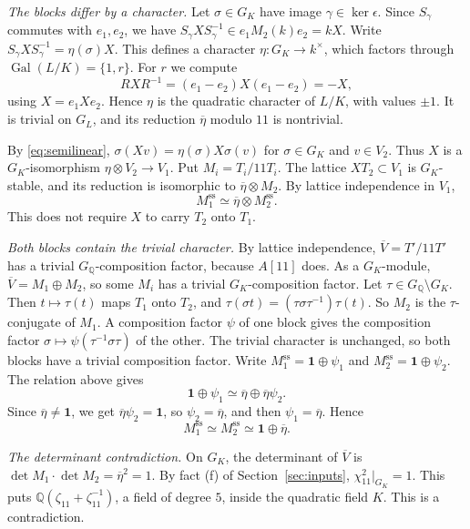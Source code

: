 \documentclass[11pt]{article}
\theoremstyle{remark}
\newcommand{\Q}{\mathbb Q}
\DeclareMathOperator{\Gal}{Gal}
\begin{document}
\emph{The blocks differ by a character.} Let \(\sigma\in G_K\) have
image \(\gamma\in\ker\epsilon\). Since \(S_\gamma\) commutes with
\(e_1,e_2\), we have \(S_\gamma XS_\gamma^{-1}\in e_1M_2(k)e_2=kX\).
Write \(S_\gamma XS_\gamma^{-1}=\eta(\sigma)X\). This defines a
character \(\eta:G_K\to k^\times\), which factors through
\(\Gal(L/K)=\{1,r\}\). For \(r\) we compute
\[
 RXR^{-1}=(e_1-e_2)X(e_1-e_2)=-X,
\]
using \(X=e_1Xe_2\). Hence \(\eta\) is the quadratic character of
\(L/K\), with values \(\pm1\). It is trivial on \(G_L\), and its
reduction \(\overline\eta\) modulo \(11\) is nontrivial.

By \eqref{eq:semilinear}, \(\sigma(Xv)=\eta(\sigma)X\sigma(v)\) for
\(\sigma\in G_K\) and \(v\in V_2\). Thus \(X\) is a
\(G_K\)-isomorphism \(\eta\otimes V_2\to V_1\). Put
\(M_i=T_i/11T_i\). The lattice \(XT_2\subset V_1\) is
\(G_K\)-stable, and its reduction is isomorphic to
\(\overline\eta\otimes M_2\). By lattice independence in \(V_1\),
\[
 M_1^{\mathrm{ss}}\simeq\overline\eta\otimes M_2^{\mathrm{ss}}.
\]
This does not require \(X\) to carry \(T_2\) onto \(T_1\).

\emph{Both blocks contain the trivial character.} By lattice
independence, \(\overline V=T'/11T'\) has a trivial
\(G_{\Q}\)-composition factor, because \(A[11]\) does. As a
\(G_K\)-module, \(\overline V=M_1\oplus M_2\), so some \(M_i\) has a
trivial \(G_K\)-composition factor. Let
\(\tau\in G_{\Q}\setminus G_K\). Then \(t\mapsto\tau(t)\) maps
\(T_1\) onto \(T_2\), and \(\tau(\sigma t)=(\tau\sigma\tau^{-1})\tau(t)\).
So \(M_2\) is the \(\tau\)-conjugate of \(M_1\). A composition factor
\(\psi\) of one block gives the composition factor
\(\sigma\mapsto\psi(\tau^{-1}\sigma\tau)\) of the other. The trivial
character is unchanged, so both blocks have a trivial composition
factor. Write \(M_1^{\mathrm{ss}}=\mathbf1\oplus\psi_1\) and
\(M_2^{\mathrm{ss}}=\mathbf1\oplus\psi_2\). The relation above gives
\[
 \mathbf1\oplus\psi_1\simeq\overline\eta\oplus\overline\eta\psi_2.
\]
Since \(\overline\eta\neq\mathbf1\), we get
\(\overline\eta\psi_2=\mathbf1\), so \(\psi_2=\overline\eta\), and then
\(\psi_1=\overline\eta\). Hence
\[
 M_1^{\mathrm{ss}}\simeq M_2^{\mathrm{ss}}\simeq\mathbf1\oplus\overline\eta.
\]

\emph{The determinant contradiction.} On \(G_K\), the determinant of
\(\overline V\) is \(\det M_1\cdot\det M_2=\overline\eta^2=1\). By
fact (f) of Section~\ref{sec:inputs}, \(\chi_{11}^2|_{G_K}=1\). This
puts \(\Q(\zeta_{11}+\zeta_{11}^{-1})\), a field of degree \(5\), inside
the quadratic field \(K\). This is a contradiction.
\end{document}
